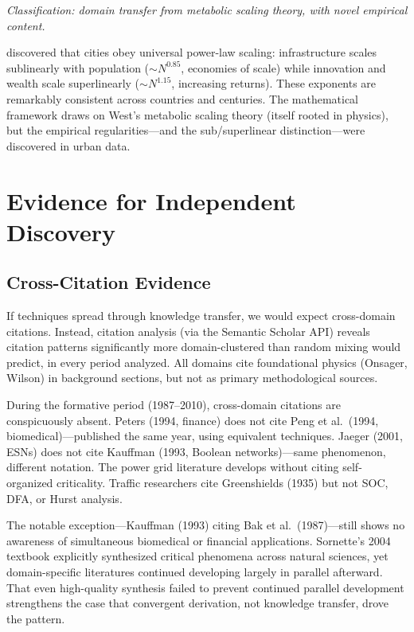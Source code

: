 \documentclass[11pt]{article}
\begin{document}
\noindent\textit{Classification: domain transfer from metabolic scaling theory, with novel empirical content.}
\smallskip

\citet{bettencourt2007} discovered that cities obey universal power-law scaling: infrastructure scales sublinearly with population ($\sim N^{0.85}$, economies of scale) while innovation and wealth scale superlinearly ($\sim N^{1.15}$, increasing returns). These exponents are remarkably consistent across countries and centuries. The mathematical framework draws on West's metabolic scaling theory (itself rooted in physics), but the empirical regularities---and the sub/superlinear distinction---were discovered in urban data.

\section{Evidence for Independent Discovery}
\label{sec:evidence}

\subsection{Cross-Citation Evidence}

If techniques spread through knowledge transfer, we would expect cross-domain citations. Instead, citation analysis (via the Semantic Scholar API) reveals citation patterns significantly more domain-clustered than random mixing would predict, in every period analyzed. All domains cite foundational physics (Onsager, Wilson) in background sections, but not as primary methodological sources.

During the formative period (1987--2010), cross-domain citations are conspicuously absent. Peters (1994, finance) does not cite Peng et al.\ (1994, biomedical)---published the same year, using equivalent techniques. Jaeger (2001, ESNs) does not cite Kauffman (1993, Boolean networks)---same phenomenon, different notation. The power grid literature develops without citing self-organized criticality. Traffic researchers cite Greenshields (1935) but not SOC, DFA, or Hurst analysis.

The notable exception---Kauffman (1993) citing Bak et al.\ (1987)---still shows no awareness of simultaneous biomedical or financial applications. Sornette's 2004 textbook \citep{sornette2004} explicitly synthesized critical phenomena across natural sciences, yet domain-specific literatures continued developing largely in parallel afterward. That even high-quality synthesis failed to prevent continued parallel development strengthens the case that convergent derivation, not knowledge transfer, drove the pattern.
\end{document}
